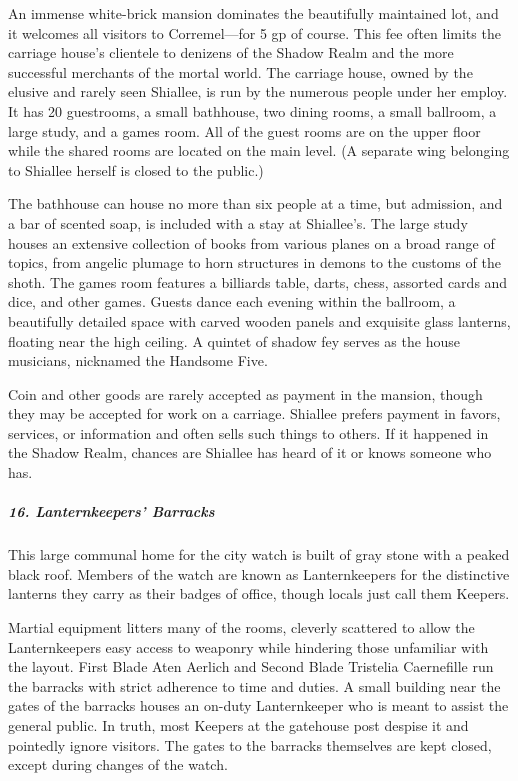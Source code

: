 \documentclass[10pt,a4paper,twoside,bg=print,twocolumn,openany,nodeprecatedcode]{dndbook}
\begin{document}
An immense white-brick mansion dominates the beautifully maintained lot, and it welcomes all visitors to Corremel—for 5 gp of course. This fee often limits the carriage house's clientele to denizens of the Shadow Realm and the more successful merchants of the mortal world. The carriage house, owned by the elusive and rarely seen Shiallee, is run by the numerous people under her employ. It has 20 guestrooms, a small bathhouse, two dining rooms, a small ballroom, a large study, and a games room. All of the guest rooms are on the upper floor while the shared rooms are located on the main level. (A separate wing belonging to Shiallee herself is closed to the public.)

The bathhouse can house no more than six people at a time, but admission, and a bar of scented soap, is included with a stay at Shiallee's. The large study houses an extensive collection of books from various planes on a broad range of topics, from angelic plumage to horn structures in demons to the customs of the shoth. The games room features a billiards table, darts, chess, assorted cards and dice, and other games. Guests dance each evening within the ballroom, a beautifully detailed space with carved wooden panels and exquisite glass lanterns, floating near the high ceiling. A quintet of shadow fey serves as the house musicians, nicknamed the Handsome Five.

Coin and other goods are rarely accepted as payment in the mansion, though they may be accepted for work on a carriage. Shiallee prefers payment in favors, services, or information and often sells such things to others. If it happened in the Shadow Realm, chances are Shiallee has heard of it or knows someone who has.

\subparagraph{16. Lanternkeepers' Barracks}
This large communal home for the city watch is built of gray stone with a peaked black roof. Members of the watch are known as Lanternkeepers for the distinctive lanterns they carry as their badges of office, though locals just call them Keepers.

Martial equipment litters many of the rooms, cleverly scattered to allow the Lanternkeepers easy access to weaponry while hindering those unfamiliar with the layout. First Blade Aten Aerlich and Second Blade Tristelia Caernefille run the barracks with strict adherence to time and duties. A small building near the gates of the barracks houses an on-duty Lanternkeeper who is meant to assist the general public. In truth, most Keepers at the gatehouse post despise it and pointedly ignore visitors. The gates to the barracks themselves are kept closed, except during changes of the watch.
\end{document}
